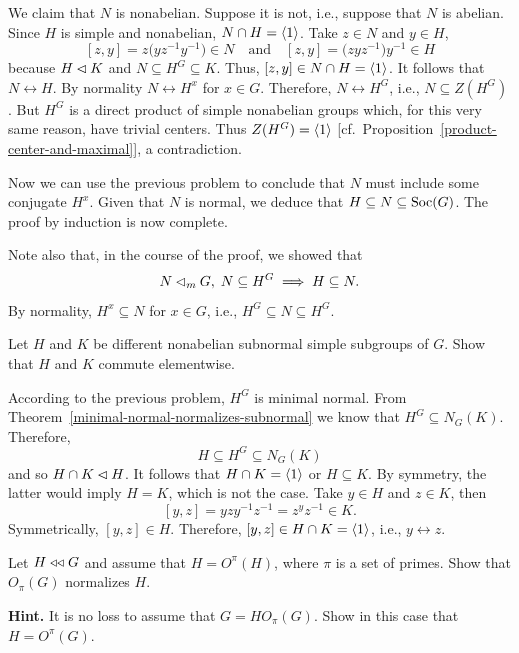 \begin{solution}
We claim that $N$ is nonabelian. Suppose it is not, i.e., suppose that $N$ is abelian. Since $H$ is simple and nonabelian, $N\cap H=\langle1\rangle$. Take $z\in N$ and $y\in H$,
$$
    [z,y]=z\big(yz^{-1}y^{-1}\big)\in N\quad\textrm{and}\quad
        [z,y]=\big(zyz^{-1}\big)y^{-1}\in H
$$
because $H\lhd K$ and $N\subseteq H^G\subseteq K$. Thus, $[z,y]\in N\cap H=\langle1\rangle$. It follows that $N\leftrightarrow H$. By normality $N\leftrightarrow H^x$ for $x\in G$. Therefore, $N\leftrightarrow H^G$, i.e., $N\subseteq Z(H^G)$. But $H^G$ is a direct product of simple nonabelian groups which, for this very same reason, have trivial centers. Thus $Z(H^G)=\langle1\rangle$ [cf.~Proposition~\ref{product-center-and-maximal}], a contradiction.

Now we can use the previous problem to conclude that $N$ must include some conjugate $H^x$. Given that $N$ is normal, we deduce that $H\subseteq N\subseteq{\rm Soc}(G)$. The proof by induction is now complete.

\medskip

Note also that, in the course of the proof, we showed that
$$
    N\lhd_mG,\; N\subseteq H^G\implies H\subseteq N.
$$
By normality, $H^x\subseteq N$ for $x\in G$, i.e., $H^G\subseteq N\subseteq H^G$.  \end{solution}

\begin{probl}
    Let\/ $H$ and\/ $K$ be different nonabelian subnormal simple subgroups of\/ $G$. Show that\/ $H$ and\/ $K$ commute elementwise.
\end{probl}

\begin{solution} According to the previous problem, $H^G$ is minimal normal. From Theorem~\ref{minimal-normal-normalizes-subnormal} we know that $H^G\subseteq N_G(K)$. Therefore,
$$
    H\subseteq H^G\subseteq N_G(K)
$$
and so $H\cap K\lhd H$. It follows that $H\cap K=\langle1\rangle$ or $H\subseteq K$. By symmetry, the latter would imply $H=K$, which is not the case. Take $y\in H$ and $z\in K$, then
$$
    [y,z]=yzy^{-1}z^{-1}=z^yz^{-1}\in K.
$$
Symmetrically, $[y,z]\in H$. Therefore, $[y,z]\in H\cap K=\langle1\rangle$, i.e., $y\leftrightarrow z$.  \end{solution}


\begin{probl}
    Let\/ $H\mathrel{\triangleleft\triangleleft} G$ and assume that\/ $H = O^\pi(H)$, where\/ $\pi$ is a set of primes. Show that\/ $O_\pi(G)$ normalizes\/ $H$.

    \textrm{\upshape\textbf{Hint.} It is no loss to assume that $G = HO_\pi(G)$. Show in this case that $H = O^\pi(G)$.}
\end{probl}

